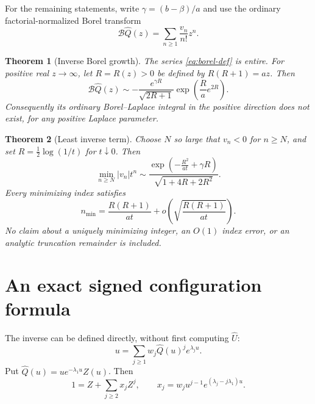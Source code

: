 \documentclass[11pt,a4paper]{article}
\numberwithin{equation}{section}
\newtheorem{theorem}{Theorem}[section]
\theoremstyle{definition}\newtheorem{definition}[theorem]{Definition}
\theoremstyle{remark}\newtheorem{remark}[theorem]{Remark}
\theoremstyle{definition}
\newcommand{\U}{\widehat U}
\newcommand{\Q}{\widehat Q}
\newcommand{\Bcal}{\mathcal B}
\begin{document}
For the remaining statements, write \(\gamma=(b-\beta)/a\) and use the
ordinary factorial-normalized Borel transform
\begin{equation}
 \Bcal\Q(z)=\sum_{n\ge1}\frac{v_n}{n!}z^n.
 \label{eq:borel-def}
\end{equation}

\begin{theorem}[Inverse Borel growth]
\label{thm:borel}
The series \eqref{eq:borel-def} is entire. For positive real \(z\to\infty\),
let \(R=R(z)>0\) be defined by \(R(R+1)=az\). Then
\begin{equation}
 \boxed{\displaystyle
 \Bcal\Q(z)\sim-
 \frac{e^{\gamma R}}{\sqrt{2R+1}}
 \exp\!\left(\frac{R}{a}e^{2R}\right).}
 \label{eq:borel}
\end{equation}
Consequently its ordinary Borel--Laplace integral in the positive direction
does not exist, for any positive Laplace parameter.
\end{theorem}

\begin{theorem}[Least inverse term]
\label{thm:least}
Choose \(N\) so large that \(v_n<0\) for \(n\ge N\), and set
\(R=\tfrac12\log(1/t)\) for \(t\downarrow0\). Then
\begin{equation}
 \boxed{\displaystyle
 \min_{n\ge N}|v_n|t^n
 \sim\frac{\exp\!\left(-\frac{R^2}{at}+\gamma R\right)}
 {\sqrt{1+4R+2R^2}}.}
 \label{eq:least}
\end{equation}
Every minimizing index satisfies
\begin{equation}
 n_{\min}=\frac{R(R+1)}{at}
       +o\!\left(\sqrt{\frac{R(R+1)}{at}}\right).
 \label{eq:minindex}
\end{equation}
No claim about a uniquely minimizing integer, an \(O(1)\) index error, or an
analytic truncation remainder is included.
\end{theorem}

\section{An exact signed configuration formula}
\label{sec:exact}

The inverse can be defined directly, without first computing \(\U\):
\begin{equation}
 u=\sum_{j\ge1}w_j\Q(u)^j e^{\lambda_j u}.
 \label{eq:inverse-kernel}
\end{equation}
Put \(\Q(u)=u e^{-\lambda_1u}Z(u)\). Then
\begin{equation}
 1=Z+\sum_{j\ge2}x_jZ^j,
 \qquad x_j=w_ju^{j-1}e^{(\lambda_j-j\lambda_1)u}.
 \label{eq:Z}
\end{equation}
\end{document}
